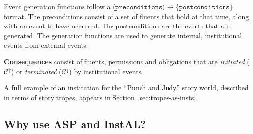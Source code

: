 \documentclass[11pt]{report}
\begin{document}
Event generation functions follow a $\langle \mathtt{preconditions} \rangle \rightarrow \{\mathtt{postconditions}\}$ format. The preconditions consist of a set of fluents that hold at that time, along with an event to have occurred. The postconditions are the events that are generated. The generation functions are used to generate internal, institutional events from external events.

\textbf{Consequences} consist of fluents, permissions and obligations that are \emph{initiated} ($\mathcal{C}^{\uparrow}$) or \emph{terminated} ($\mathcal{C}^{\downarrow}$) by institutional events. 

A full example of an institution for the ``Punch and Judy'' story world,
described in terms of story tropes, appears in Section~\ref{sec:tropes-as-insts}.

\subsection{Why use ASP and InstAL?}
\label{sec:why-asp-instal}
\end{document}
